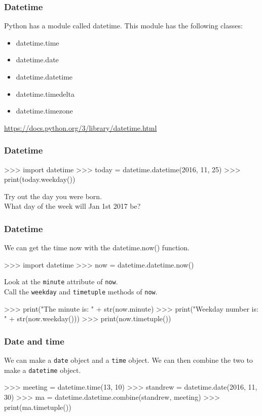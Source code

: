 \documentclass{beamer}
\begin{document}
\begin{frame}[fragile]
\frametitle{Datetime}
Python has a module called datetime. This module has the following classes:
\begin{itemize}
\item datetime.time
\item datetime.date
\item datetime.datetime
\item datetime.timedelta
\item datetime.timezone
\end{itemize}
\url{https://docs.python.org/3/library/datetime.html}
\end{frame}


\begin{frame}[fragile]
\frametitle{Datetime}

\begin{code}
>>> import datetime
>>> today = datetime.datetime(2016, 11, 25)
>>> print(today.weekday())
\end{code}

\bigskip

Try out the day you were born. \\
What day of the week will Jan 1st 2017 be?
\end{frame}

\begin{frame}[fragile]
\frametitle{Datetime}
We can get the time now with the datetime.now() function.
\begin{code}
>>> import datetime
>>> now = datetime.datetime.now()
\end{code}

\bigskip

Look at the \texttt{minute} attribute of \texttt{now}. \\
Call the
\texttt{weekday} and \texttt{timetuple} methods of \texttt{now}.
\begin{code}
>>> print("The minute is: " + str(now.minute)
>>> print("Weekday number is: " + str(now.weekday()))
>>> print(now.timetuple())
\end{code}

\end{frame}

\begin{frame}[fragile]
\frametitle{Date and time}
We can make a \texttt{date} object and a \texttt{time} object. We can then combine the two to make a \texttt{datetime} object.
\begin{code}
>>> meeting = datetime.time(13, 10)
>>> standrew = datetime.date(2016, 11, 30)
>>> ma = datetime.datetime.combine(standrew, meeting)
>>> print(ma.timetuple())
\end{code}

\end{frame}
\end{document}
